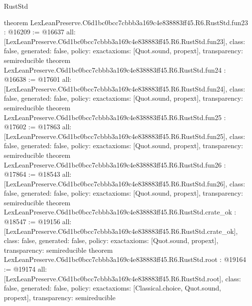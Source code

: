 \begin{lexlean}{RustStd}
\begin{coremodule}
{}
theorem LexLeanPreserve.C6d1bc0bcc7cbbb3a169c4e838883ff45.R6.RustStd.fun23 : @16209 := @16637 {
  all: [LexLeanPreserve.C6d1bc0bcc7cbbb3a169c4e838883ff45.R6.RustStd.fun23],
  class: false,
  generated: false,
  policy: exact{axioms: [Quot.sound, propext]},
  transparency: semireducible
}
theorem LexLeanPreserve.C6d1bc0bcc7cbbb3a169c4e838883ff45.R6.RustStd.fun24 : @16638 := @17601 {
  all: [LexLeanPreserve.C6d1bc0bcc7cbbb3a169c4e838883ff45.R6.RustStd.fun24],
  class: false,
  generated: false,
  policy: exact{axioms: [Quot.sound, propext]},
  transparency: semireducible
}
theorem LexLeanPreserve.C6d1bc0bcc7cbbb3a169c4e838883ff45.R6.RustStd.fun25 : @17602 := @17863 {
  all: [LexLeanPreserve.C6d1bc0bcc7cbbb3a169c4e838883ff45.R6.RustStd.fun25],
  class: false,
  generated: false,
  policy: exact{axioms: [Quot.sound, propext]},
  transparency: semireducible
}
theorem LexLeanPreserve.C6d1bc0bcc7cbbb3a169c4e838883ff45.R6.RustStd.fun26 : @17864 := @18543 {
  all: [LexLeanPreserve.C6d1bc0bcc7cbbb3a169c4e838883ff45.R6.RustStd.fun26],
  class: false,
  generated: false,
  policy: exact{axioms: [Quot.sound, propext]},
  transparency: semireducible
}
theorem LexLeanPreserve.C6d1bc0bcc7cbbb3a169c4e838883ff45.R6.RustStd.crate_ok : @18547 := @19156 {
  all: [LexLeanPreserve.C6d1bc0bcc7cbbb3a169c4e838883ff45.R6.RustStd.crate_ok],
  class: false,
  generated: false,
  policy: exact{axioms: [Quot.sound, propext]},
  transparency: semireducible
}
theorem LexLeanPreserve.C6d1bc0bcc7cbbb3a169c4e838883ff45.R6.RustStd.root : @19164 := @19174 {
  all: [LexLeanPreserve.C6d1bc0bcc7cbbb3a169c4e838883ff45.R6.RustStd.root],
  class: false,
  generated: false,
  policy: exact{axioms: [Classical.choice, Quot.sound, propext]},
  transparency: semireducible
}


\end{coremodule}
\end{lexlean}
